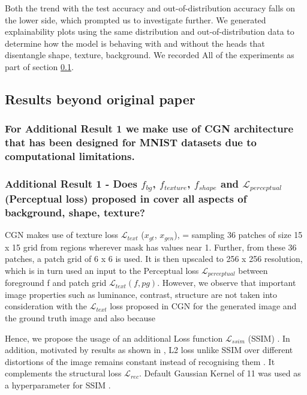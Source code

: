 Both the trend with the test accuracy and out-of-distribution accuracy falls on the lower side, which prompted us to investigate further. We generated explainability plots using the same distribution and out-of-distribution data to determine how the model is behaving with and without the heads that disentangle shape, texture, background. We recorded All of the experiments as part of section \ref{section:resultsbeyondpaper}.

\subsection{Results beyond original paper}
\label{section:resultsbeyondpaper}
\subsubsection{For Additional Result 1 we make use of CGN \cite{sauer2021counterfactual} architecture that has been designed for MNIST datasets due to computational limitations.}
\subsubsection{Additional Result 1 - Does  $f_{bg}$, $f_{texture}$, $f_{shape}$ and $\mathcal{L}_{perceptual}$ (Perceptual loss) proposed in \cite{sauer2021counterfactual} cover all aspects of background, shape, texture? }

CGN \cite{sauer2021counterfactual} makes use of texture loss $\mathcal{L}_{text}$ ($x_{gt}$, $x_{gen}$), = sampling 36 patches of size 15 x 15 grid from regions wherever mask has values near 1. Further, from these 36 patches, a patch grid of 6 x 6 is used. It is then upscaled to 256 x 256 resolution, which is in turn used an input to the Perceptual loss $\mathcal{L}_{perceptual}$ between foreground f and patch grid $\mathcal{L}_{text} (f, pg)$. 
However, we observe that important image properties such as luminance, contrast, structure are not taken into consideration with the $\mathcal{L}_{text}$ loss proposed in CGN \cite{sauer2021counterfactual} for the generated image and the ground truth image and also because 

Hence, we propose the usage of an additional Loss function $\mathcal{L}_{ssim}$ (SSIM) \citep{wang2004image}. In addition, motivated by results as shown in \cite{zhao2016loss}, \cite{pandey2020unsupervised} L2 loss unlike SSIM \cite{wang2004image} over different distortions of the image remains constant instead of recognising them . It complements the structural loss $\mathcal{L}_{rec}$. 
Default Gaussian Kernel of 11 was used as a hyperparameter for SSIM \citep{wang2004image}.


